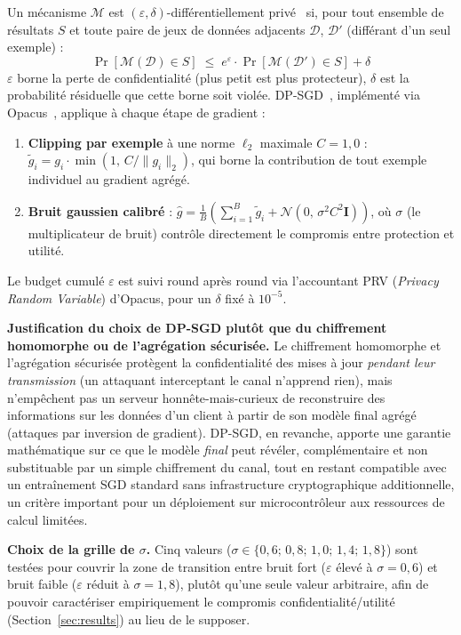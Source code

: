 \documentclass{acmart}
\begin{document}
Un mécanisme $\mathcal{M}$ est $(\varepsilon, \delta)$-différentiellement
privé~\cite{dwork2014foundations} si, pour tout ensemble de résultats $S$ et
toute paire de jeux de données adjacents $\mathcal{D}$, $\mathcal{D}'$
(différant d'un seul exemple) :
\begin{equation}
  \Pr[\mathcal{M}(\mathcal{D}) \in S] \;\leq\; e^\varepsilon \cdot
  \Pr[\mathcal{M}(\mathcal{D}') \in S] + \delta
  \label{eq:dp_form}
\end{equation}
$\varepsilon$ borne la perte de confidentialité (plus petit est plus
protecteur), $\delta$ est la probabilité résiduelle que cette borne soit
violée. DP-SGD~\cite{abadi2016deep}, implémenté via
Opacus~\cite{opacus}, applique à chaque étape de gradient :
\begin{enumerate}
  \item \textbf{Clipping par exemple} à une norme $\ell_2$ maximale $C=1{,}0$ :
  $\tilde{g}_i = g_i \cdot \min\!\left(1,\, C / \|g_i\|_2\right)$, qui borne
  la contribution de tout exemple individuel au gradient agrégé.
  \item \textbf{Bruit gaussien calibré} :
  $\hat{g} = \frac{1}{B}\!\left(\sum_{i=1}^B \tilde{g}_i +
  \mathcal{N}\!\left(0,\, \sigma^2 C^2 \mathbf{I}\right)\right)$,
  où $\sigma$ (le multiplicateur de bruit) contrôle directement le compromis
  entre protection et utilité.
\end{enumerate}
Le budget cumulé $\varepsilon$ est suivi round après round via l'accountant
PRV (\textit{Privacy Random Variable}) d'Opacus, pour un $\delta$ fixé à
$10^{-5}$.

\textbf{Justification du choix de DP-SGD plutôt que du chiffrement homomorphe
ou de l'agrégation sécurisée.} Le chiffrement homomorphe et l'agrégation
sécurisée protègent la confidentialité des mises à jour \emph{pendant leur
transmission} (un attaquant interceptant le canal n'apprend rien), mais
n'empêchent pas un serveur honnête-mais-curieux de reconstruire des
informations sur les données d'un client à partir de son modèle final agrégé
(attaques par inversion de gradient). DP-SGD, en revanche, apporte une
garantie mathématique sur ce que le modèle \emph{final} peut révéler,
complémentaire et non substituable par un simple chiffrement du canal, tout
en restant compatible avec un entraînement SGD standard sans infrastructure
cryptographique additionnelle, un critère important pour un déploiement sur
microcontrôleur aux ressources de calcul limitées.

\textbf{Choix de la grille de $\sigma$.} Cinq valeurs
($\sigma \in \{0{,}6;\,0{,}8;\,1{,}0;\,1{,}4;\,1{,}8\}$) sont testées pour
couvrir la zone de transition entre bruit fort ($\varepsilon$ élevé à
$\sigma=0{,}6$) et bruit faible ($\varepsilon$ réduit à $\sigma=1{,}8$),
plutôt qu'une seule valeur arbitraire, afin de pouvoir caractériser
empiriquement le compromis confidentialité/utilité (Section~\ref{sec:results})
au lieu de le supposer.
\end{document}
